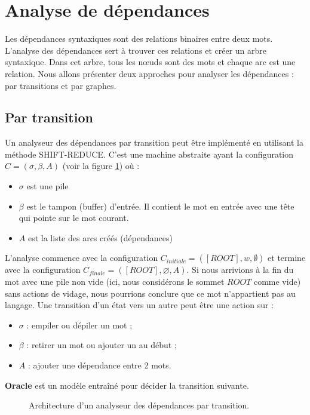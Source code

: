 \documentclass{KodeBook}
\begin{document}
\section{Analyse de dépendances}

Les dépendances syntaxiques sont des relations binaires entre deux mots. 
L'analyse des dépendances sert à trouver ces relations et créer un arbre syntaxique. 
Dans cet arbre, tous les nœuds sont des mots et chaque arc est une relation.
Nous allons présenter deux approches pour analyser les dépendances : par transitions et par graphes.

\subsection{Par transition}

Un analyseur des dépendances par transition peut être implémenté en utilisant la méthode SHIFT-REDUCE. 
C'est une machine abstraite ayant la configuration $C = (\sigma, \beta, A)$ (voir la figure \ref{fig:dep-trans-arch}) où :
\begin{itemize}
	\item $\sigma$ est une pile
	\item $\beta$ est le tampon (buffer) d'entrée. 
	Il contient le mot en entrée avec une tête qui pointe sur le mot courant.
	\item $A$ est la liste des arcs créés (dépendances)
\end{itemize}
L'analyse commence avec la configuration $C_{initiale} = ([ROOT], w, \emptyset)$ et termine avec la configuration $C_{finale} = ([ROOT], \varnothing, A)$.
Si nous arrivions à la fin du mot avec une pile non vide (ici, nous considérons le sommet $ROOT$ comme vide) sans actions de vidage, nous pourrions conclure que ce mot n'appartient pas au langage. 
Une transition d'un état vers un autre peut être une action sur :
\begin{itemize}
	\item $\sigma$ : empiler ou dépiler un mot ;
	\item $\beta$ : retirer un mot ou ajouter un au début ;
	\item $A$ : ajouter une dépendance entre 2 mots.
\end{itemize}
\textbf{Oracle} est un modèle entraîné pour décider la transition suivante.

\begin{figure}[ht]
	\centering
	\caption{Architecture d'un analyseur des dépendances par transition.}
	\label{fig:dep-trans-arch}
\end{figure}
\end{document}
